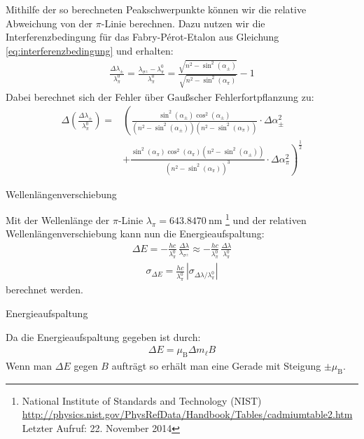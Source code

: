 \documentclass[11pt, a4paper]{article}
\begin{document}
Mithilfe der so berechneten Peakschwerpunkte können wir die relative Abweichung von der $\pi$-Linie berechnen.
Dazu nutzen wir die Interferenzbedingung für das Fabry-Pérot-Etalon aus Gleichung \ref{eq:interferenzbedingung} und erhalten:
\begin{align}
	\frac{\Delta \lambda_\pm}{\lambda_\pi^0} = \frac{\lambda_{\sigma^\pm} - \lambda_\pi^0}{\lambda_\pi^0} = \frac{\sqrt{n^2 - \sin^2(\alpha_{\pm})}}{\sqrt{n^2 - \sin^2(\alpha_\pi)}} - 1
\end{align}
Dabei berechnet sich der  Fehler über Gaußscher Fehlerfortpflanzung zu:
\begin{align}
	\Delta \left( \frac{\Delta \lambda_\pm}{\lambda_\pi^0} \right) = & \left( \frac{\sin^2(\alpha_\pm) \cos^2(\alpha_\pm)}{(n^2-\sin^2(\alpha_\pm))(n^2-\sin^2(\alpha_\pi))} \cdot \Delta \alpha_\pm^2 \right. \nonumber\\
	& \left. + \frac{\sin^2(\alpha_\pi) \cos^2(\alpha_\pi) (n^2 - \sin^2(\alpha_\pm))}{(n^2-\sin^2(\alpha_\pi))^3} \cdot \Delta \alpha_\pi^2\right)^\frac{1}{2}
\end{align}

\begin{table}[h]
	\centering
	
	\caption{Wellenlängenverschiebung}
	\label{tab:verschiebung_wellenlaenge}
\end{table}
Mit der Wellenlänge der $\pi$-Linie $\lambda_\pi = \SI{643,8470}{\nano\metre}$ \footnote{National Institute of Standards and Technology (NIST)\\ \url{http://physics.nist.gov/PhysRefData/Handbook/Tables/cadmiumtable2.htm}\\Letzter Aufruf: 22. November 2014} und der relativen Wellenlängenverschiebung kann nun die Energieaufspaltung:
\begin{align}
	\Delta E = -\frac{h c}{\lambda_\pi^0}\,\frac{\Delta \lambda}{\lambda_{\sigma^\pm}} \approx -\frac{h c}{\lambda_\pi^0}\,\frac{\Delta \lambda}{\lambda_\pi^0}
\end{align}
\begin{align}
	\sigma_{\Delta E} = \frac{h c}{\lambda_\pi^0} \, | \sigma_{\Delta \lambda / \lambda_\pi^0} |
\end{align}
berechnet werden.
\begin{table}[h]
	\centering
	
	\caption{Energieaufspaltung}
	\label{tab:energieaufspaltung}
\end{table}

Da die Energieaufspaltung gegeben ist durch:
\begin{align}
	\Delta E = \mu_\mathrm{B} \Delta m_\ell B
\end{align}
Wenn man $\Delta E$ gegen $B$ aufträgt so erhält man eine Gerade mit Steigung $\pm \mu_\mathrm{B}$.
\end{document}
